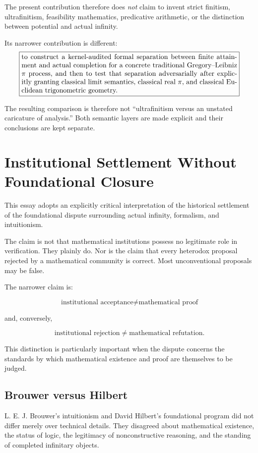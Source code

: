 \documentclass[11pt,a4paper]{article}
\begin{document}
The present contribution therefore does \emph{not} claim to invent
strict finitism, ultrafinitism, feasibility mathematics, predicative
arithmetic, or the distinction between potential and actual infinity.

Its narrower contribution is different:
\[
\boxed{
\begin{minipage}{0.90\linewidth}
to construct a kernel-audited formal separation between finite
attainment and actual completion for a concrete traditional
Gregory--Leibniz $\pi$ process, and then to test that separation
adversarially after explicitly granting classical limit semantics,
classical real $\pi$, and classical Euclidean trigonometric geometry.
\end{minipage}
}
\]

The resulting comparison is therefore not ``ultrafinitism versus an
unstated caricature of analysis.''  Both semantic layers are made
explicit and their conclusions are kept separate.


\section{Institutional Settlement Without Foundational Closure}

This essay adopts an explicitly critical interpretation of the
historical settlement of the foundational dispute surrounding actual
infinity, formalism, and intuitionism.

The claim is not that mathematical institutions possess no legitimate
role in verification. They plainly do. Nor is the claim that every
heterodox proposal rejected by a mathematical community is correct.
Most unconventional proposals may be false.

The narrower claim is:

\[
\boxed{
\text{institutional acceptance}
\neq
\text{mathematical proof}
}
\]

and, conversely,

\[
\boxed{
\text{institutional rejection}
\neq
\text{mathematical refutation}.
}
\]

This distinction is particularly important when the dispute concerns
the standards by which mathematical existence and proof are themselves
to be judged.

\subsection{Brouwer versus Hilbert}

L. E. J. Brouwer's intuitionism and David Hilbert's foundational
program did not differ merely over technical details. They disagreed
about mathematical existence, the status of logic, the legitimacy of
nonconstructive reasoning, and the standing of completed infinitary
objects.
\end{document}
